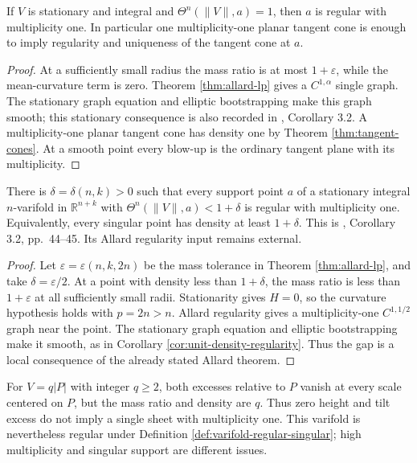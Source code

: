 \begin{corollary}\label{cor:unit-density-regularity}
If $V$ is stationary and integral and $\Theta^n(\|V\|,a)=1$, then $a$ is regular with multiplicity one. In particular one multiplicity-one planar tangent cone is enough to imply regularity and uniqueness of the tangent cone at $a$.
\end{corollary}
\begin{proof}
At a sufficiently small radius the mass ratio is at most $1+\varepsilon$, while the mean-curvature term is zero. Theorem \ref{thm:allard-lp} gives a $C^{1,\alpha}$ single graph. The stationary graph equation and elliptic bootstrapping make this graph smooth; this stationary consequence is also recorded in \cite{Minter}, Corollary 3.2. A multiplicity-one planar tangent cone has density one by Theorem \ref{thm:tangent-cones}. At a smooth point every blow-up is the ordinary tangent plane with its multiplicity.
\end{proof}

\begin{theorem}\label{thm:stationary-density-gap}
There is $\delta=\delta(n,k)>0$ such that every support point $a$ of a stationary integral $n$-varifold in $\mathbb R^{n+k}$ with $\Theta^n(\|V\|,a)<1+\delta$ is regular with multiplicity one. Equivalently, every singular point has density at least $1+\delta$. This is \cite{Minter}, Corollary 3.2, pp.~44--45. Its Allard regularity input remains external.
\end{theorem}
\begin{proof}
Let $\varepsilon=\varepsilon(n,k,2n)$ be the mass tolerance in Theorem \ref{thm:allard-lp}, and take $\delta=\varepsilon/2$. At a point with density less than $1+\delta$, the mass ratio is less than $1+\varepsilon$ at all sufficiently small radii. Stationarity gives $H=0$, so the curvature hypothesis holds with $p=2n>n$. Allard regularity gives a multiplicity-one $C^{1,1/2}$ graph near the point. The stationary graph equation and elliptic bootstrapping make it smooth, as in Corollary \ref{cor:unit-density-regularity}. Thus the gap is a local consequence of the already stated Allard theorem.
\end{proof}


\begin{example}\label{ex:multiple-plane-excess}
For $V=q|P|$ with integer $q\geq2$, both excesses relative to $P$ vanish at every scale centered on $P$, but the mass ratio and density are $q$. Thus zero height and tilt excess do not imply a single sheet with multiplicity one. This varifold is nevertheless regular under Definition \ref{def:varifold-regular-singular}; high multiplicity and singular support are different issues.
\end{example}
